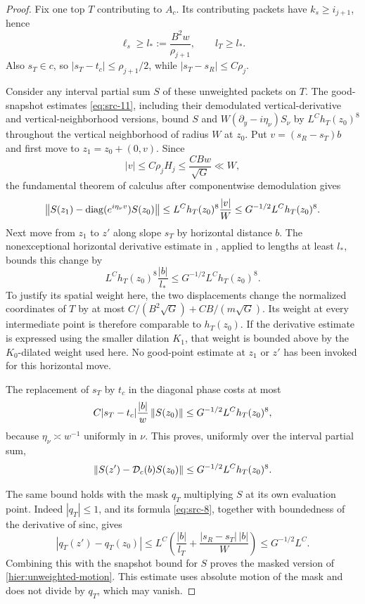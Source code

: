 \begin{proof}
Fix one top $T$ contributing to $A_c$.  Its contributing packets have
$k_s\ge i_{j+1}$, hence
\begin{equation}
 \ell_s\ge l_*:=\frac{B^2w}{\rho_{j+1}},
 \qquad l_T\ge l_*.
 \label{hier:predictable-length}
\end{equation}
Also $s_T\in c$, so $|s_T-t_c|\le\rho_{j+1}/2$, while
$|s_T-s_R|\le C\rho_j$.

Consider any interval partial sum $S$ of these unweighted packets on
$T$.  The good-snapshot estimates \eqref{eq:src-11}, including their
demodulated vertical-derivative and vertical-neighborhood versions, bound
$S$ and $W(\partial_y-i\eta_\nu)S_\nu$ by
$L^Ch_T(z_0)^8$ throughout the vertical neighborhood of radius $W$
at $z_0$.  Put $v=(s_R-s_T)b$ and first move to
$z_1=z_0+(0,v)$.  Since
\[
 |v|\le C\rho_jH_j\le\frac{CBw}{\sqrt G}\ll W,
\]
the fundamental theorem of calculus after componentwise demodulation
gives
\[
 \left\|S(z_1)-\operatorname{diag}(e^{i\eta_\nu v})S(z_0)\right\|
 \le L^Ch_T(z_0)^8\frac{|v|}{W}
 \le G^{-1/2}L^Ch_T(z_0)^8.
\]
Next move from $z_1$ to $z'$ along slope $s_T$ by horizontal distance
$b$.  The nonexceptional horizontal derivative estimate in
, applied to lengths at least $l_*$, bounds this
change by
\[
 L^Ch_T(z_0)^8\frac{|b|}{l_*}
 \le G^{-1/2}L^Ch_T(z_0)^8.
\]
To justify its spatial weight here, the two displacements change the
normalized coordinates of $T$ by at most
$C/(B^2\sqrt G)+CB/(m\sqrt G)$.  Its weight at every intermediate
point is therefore comparable to $h_T(z_0)$.  If the derivative estimate
is expressed using the smaller dilation $K_1$, that weight is bounded
above by the $K_0$-dilated weight used here.  No good-point estimate at
$z_1$ or $z'$ has been invoked for this horizontal move.

The replacement of $s_T$ by $t_c$ in the diagonal phase costs at most
\[
 C|s_T-t_c|\frac{|b|}{w}\left\|S(z_0)\right\|
 \le G^{-1/2}L^Ch_T(z_0)^8,
\]
because $\eta_\nu\asymp w^{-1}$ uniformly in $\nu$.
This proves, uniformly over the interval partial sum,
\begin{equation}
 \left\|S(z')-\mathcal D_c(b)S(z_0)\right\|
 \le G^{-1/2}L^Ch_T(z_0)^8.
 \label{hier:unweighted-motion}
\end{equation}

The same bound holds with the mask $q_T$ multiplying $S$ at its own
evaluation point.  Indeed $|q_T|\le1$, and its formula
\eqref{eq:src-8}, together with boundedness of the derivative of sinc,
gives
\[
 |q_T(z')-q_T(z_0)|
 \le L^C\left(\frac{|b|}{l_T}
                    +\frac{|s_R-s_T|\,|b|}{W}\right)
 \le G^{-1/2}L^C.
\]
Combining this with the snapshot bound for $S$ proves the masked version
of \eqref{hier:unweighted-motion}.  This estimate uses absolute motion
of the mask and does not divide by $q_T$, which may vanish.


\end{proof}
